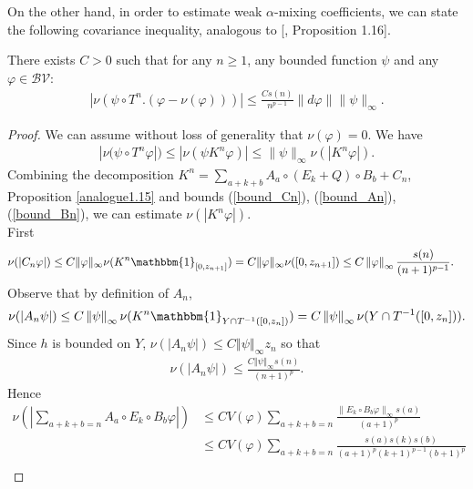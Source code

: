 \documentclass{ws-sd}
\newcommand{\indic}{\mathbbm{1}}
\newcommand{\norm}[1]{\left\Vert #1\right\Vert}
\newcommand{\abs}[1]{\left\lvert #1 \right\rvert}
\newcommand\bigp[1]{\left(#1\right)}
\begin{document}
On the other hand, in order to estimate weak $\alpha$-mixing coefficients, we can state the following covariance inequality, analogous to [, Proposition 1.16].
\begin{proposition}\label{analogue1.16}
    There exists $C > 0$ such that for any $n \ge 1$, any bounded function $\psi$ and any $\varphi \in \mathcal{BV}$:
    \begin{align*}
        \abs{\nu\bigp{\psi\circ T^n . (\varphi- \nu(\varphi))}} \le \frac{Cs(n)}{n^{p-1}} \rVert d\varphi \lVert \rVert \psi \lVert_{\infty}.
    \end{align*}
\end{proposition}
\begin{proof}
    We can assume without loss of generality that $\nu(\varphi) = 0$. We have
    \begin{align*}
        \abs{\nu(\psi\circ T^n \varphi})
        \le \abs{\nu(\psi K^n\varphi)}
        \le \rVert \psi \lVert_{\infty} \nu(\abs{K^n\varphi}).
    \end{align*}
    Combining the decomposition $K^n= \sum_{a+k+b}A_a \circ (E_k + Q) \circ B_b +C_n$, Proposition \ref{analogue1.15} and bounds (\ref{bound_Cn}), (\ref{bound_An}), (\ref{bound_Bn}), we can estimate $\nu (\abs{K^n\varphi})$. \\
    First
    \begin{align*}
        \nu(\abs{C_n\varphi}) &\le C \rVert \varphi \lVert_{\infty} \nu(K^n \indic_{[0,z_{n+1}]})
        = C \rVert \varphi \lVert_{\infty} \nu({[0,z_{n+1}]})
        \le C\norm{\varphi}_{\infty}\frac{s(n)}{(n+1)^{p-1}}.
    \end{align*}
    Observe that by definition of $A_n$,
    \begin{align*}
         \nu(\abs{A_n\psi})
         \le C \norm{\psi}_{\infty} \nu (K^n\indic_{Y\cap T^{-1}([0,z_n])})
         = C\norm{\psi}_{\infty} \nu(Y\cap T^{-1}([0,z_n])).
    \end{align*}
    Since $h$ is bounded on $Y$, $\nu(\abs{A_n\psi}) \le C \norm{\psi}_{\infty}z_n$ so that
    \begin{align*}
         \nu(\abs{A_n\psi}) \le \frac{C\norm{\psi}_{\infty}s(n)}{(n+1)^p}.
    \end{align*}
    Hence
    \begin{align*}
        \nu \bigp{\abs{\sum_{a+k+b = n}A_a \circ E_k \circ B_b\varphi}}
        &\le CV(\varphi)\sum_{a+k+b=n}\frac{\lVert E_k \circ B_b\varphi\rVert_{\infty}s(a)}{(a+1)^p} \\
        &\le CV(\varphi)\sum_{a+k+b=n}\frac{s(a)s(k)s(b)}{(a+1)^p(k+1)^{p-1}(b+1)^p} \\

\end{align*}
\end{proof}
\end{document}
